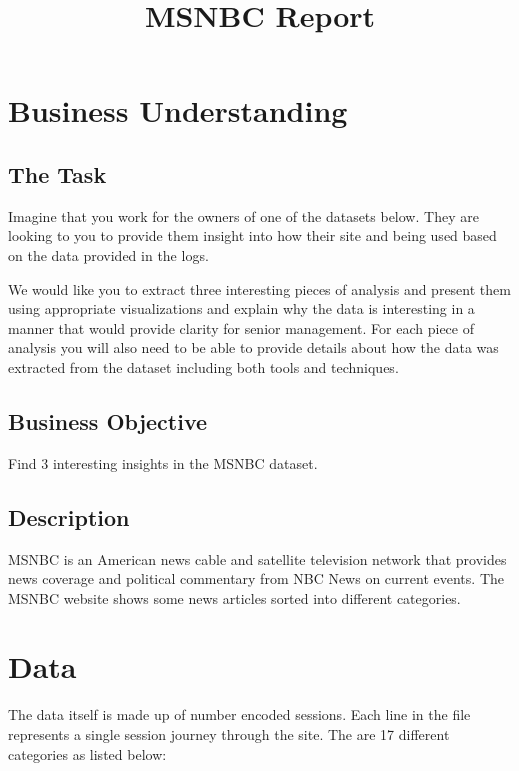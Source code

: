 \documentclass{article}
\title{MSNBC Report}
\begin{document}
\maketitle

\section{Business Understanding}
\subsection{The Task}
\begin{displayquote}
Imagine that you work for the owners of one of the datasets below. They are looking to you to provide them insight into how their site and being used based on the data provided in the logs.

We would like you to extract three interesting pieces of analysis and present them using appropriate visualizations and explain why the data is interesting in a manner that would provide clarity for senior management. For each piece of analysis you will also need to be able to provide details about how the data was extracted from the dataset including both tools and techniques.
\end{displayquote}

\subsection{Business Objective}
Find 3 interesting insights in the MSNBC dataset.

\subsection{Description}
MSNBC is an American news cable and satellite television network that provides news coverage and political commentary from NBC News on current events. The MSNBC website shows some news articles sorted into different categories.

\section{Data}
The data itself is made up of number encoded sessions. Each line in the file represents a single session journey through the site. The are 17 different categories as listed below:
\end{document}
